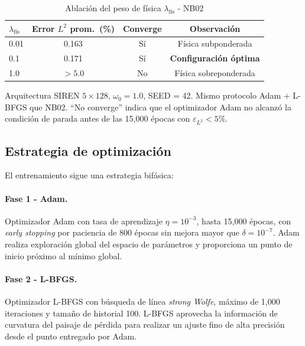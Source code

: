 \begin{table}[htbp]
\centering
\begin{threeparttable}
\caption{Ablación del peso de física $\lambda_{\mathrm{fís}}$ - NB02}
\label{tab:ablacion_lambda}
\begin{tabular}{lccc}
\toprule
$\lambda_{\mathrm{fís}}$ & Error $L^2$ prom.\ (\%) & Converge & Observación \\
\midrule
0.01  & 0.163 & Sí & Física subponderada \\
0.1   & 0.171 & Sí & \textbf{Configuración óptima} \\
1.0   & $>5.0$ & No & Física sobreponderada \\
\bottomrule
\end{tabular}
\begin{tablenotes}
\small
\item Arquitectura SIREN $5\times128$, $\omega_0 = 1.0$, SEED = 42.
      Mismo protocolo Adam + L-BFGS que NB02.
      ``No converge'' indica que el optimizador Adam no alcanzó la condición
      de parada antes de las 15{,}000 épocas con $\varepsilon_{L^2} < 5\%$.
\end{tablenotes}
\end{threeparttable}
\end{table}

\subsection{Estrategia de optimización}
\label{subsec:optimizacion}

El entrenamiento sigue una estrategia bifásica:

\paragraph{Fase 1 - Adam.}
Optimizador Adam con tasa de aprendizaje $\eta = 10^{-3}$, hasta 15{,}000 épocas,
con \textit{early stopping} por paciencia de 800 épocas sin mejora mayor que
$\delta = 10^{-7}$.
Adam realiza exploración global del espacio de parámetros y proporciona un punto
de inicio próximo al mínimo global.

\paragraph{Fase 2 - L-BFGS.}
Optimizador L-BFGS con búsqueda de línea \textit{strong Wolfe}, máximo de 1{,}000
iteraciones y tamaño de historial 100.
L-BFGS aprovecha la información de curvatura del paisaje de pérdida para realizar
un ajuste fino de alta precisión desde el punto entregado por Adam.

